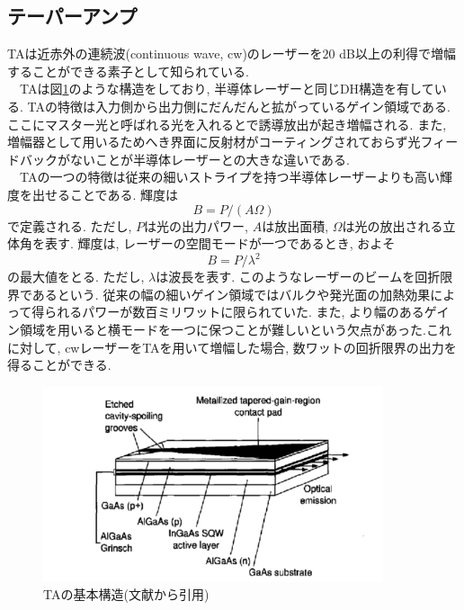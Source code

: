 \documentclass[uplatex, dvipdfmx, a4paper, report, papersize, 11pt]{jsbook}
\begin{document}
\subsection{テーパーアンプ}
 TAは近赤外の連続波(continuous wave,  cw)のレーザーを$20$ dB以上の利得で増幅することができる素子として知られている\cite{Cruz:06}.\\
　TAは図\ref{TA_structure}のような構造をしており, 半導体レーザーと同じDH構造を有している. TAの特徴は入力側から出力側にだんだんと拡がっているゲイン領域である. ここにマスター光と呼ばれる光を入れるとで誘導放出が起き増幅される. また, 増幅器として用いるためへき界面に反射材がコーティングされておらず光フィードバックがないことが半導体レーザーとの大きな違いである.\\
　TAの一つの特徴は従来の細いストライプを持つ半導体レーザーよりも高い輝度を出せることである. 輝度は
 \begin{equation}
   B = P/(A\Omega)
 \end{equation}
で定義される. ただし, $P$は光の出力パワー, $A$は放出面積, $\Omega$は光の放出される立体角を表す. 輝度は, レーザーの空間モードが一つであるとき, およそ
\begin{equation}
  B = P/\lambda^2
\end{equation}
の最大値をとる\cite{Walpole1996}. ただし, $\lambda$は波長を表す. このようなレーザーのビームを回折限界であるという. 従来の幅の細いゲイン領域ではバルクや発光面の加熱効果によって得られるパワーが数百ミリワットに限られていた. また, より幅のあるゲイン領域を用いると横モードを一つに保つことが難しいという欠点があった.これに対して, cwレーザーをTAを用いて増幅した場合, 数ワットの回折限界の出力を得ることができる\cite{Walpole1996}.


\begin{figure}[htbp]
 \begin{center}
  \includegraphics[width=100mm]{figures/chapter2/TA_structure.png}
 \end{center}
 \caption{TAの基本構造(文献\cite{Walpole1996}から引用)}
 \label{TA_structure}
\end{figure}
\end{document}
